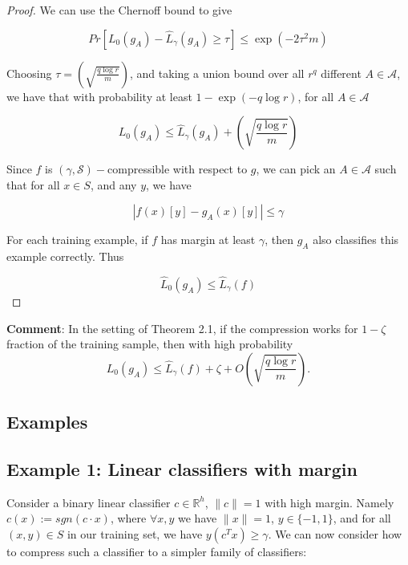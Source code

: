 \begin{proof}

We can use the Chernoff bound to give 

\begin{equation}
Pr[L_{0}(g_{A}) - \hat{L}_{\gamma}(g_{A})\geq \tau ] \leq \exp(-2\tau^2 m)
\end{equation}

Choosing $\tau=\left(\sqrt{\frac{q\log r}{m}}\right)$, and taking a union bound over all $r^{q}$ different $A \in \mathcal{A}$, we have that with probability at least $1-\exp(-q\log r)$, for all $A \in \mathcal{A}$

\begin{equation}
L_{0}(g_{A}) \leq \hat{L}_{\gamma}(g_{A})+\left(\sqrt{\frac{q\log r}{m}}\right)
\end{equation}

Since $f$ is $(\gamma,\mathcal{S})-$compressible with respect to $g$, we can pick an $A \in \mathcal{A}$ such that for all $x \in S$, and any $y$, we have

\begin{equation}
|f(x)[y]-g_{A}(x)[y]|\leq \gamma
\end{equation}

For each training example, if $f$ has margin at least $\gamma$, then $g_{A}$ also classifies this example correctly. Thus

\begin{equation}
\hat{L}_{0}(g_{A})\leq \hat{L}_{\gamma}(f)
\end{equation}

\end{proof}

\textbf{Comment}: In the setting of Theorem 2.1, if the compression works for $1-\zeta$ fraction of the training sample, then with high probability
$$
    L_0(g_A) \le \hat{L}_\gamma(f)+ \zeta+O\left(\sqrt{\frac{q\log r}{m}}\right).
    $$




\subsection{Examples}

\subsection{Example 1: Linear classifiers with margin}

Consider a binary linear classifier $c \in \mathbb{R}^{h}$, $\|c\|=1$ with high margin. Namely $c(x):=sgn(c \cdot x)$, where $\forall x,y$ we have  $\|x\|=1$, $y \in \{-1,1\}$, and for all $(x,y)\in S$ in our training set, we have $y(c^{T}x)\geq \gamma$. We can now consider how to compress such a classifier to a simpler family of classifiers:

